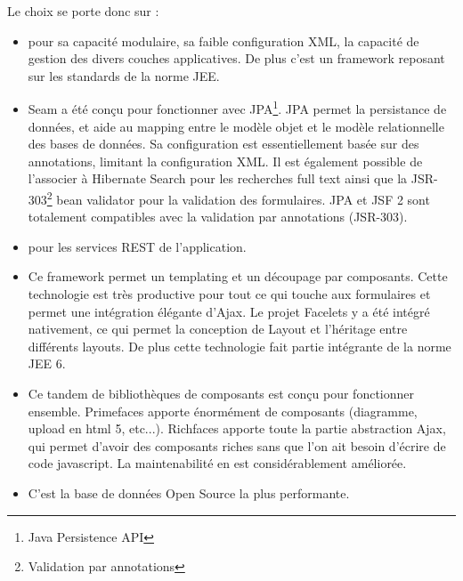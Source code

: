 \newpage{}
Le choix se porte donc sur :
\begin{itemize}
	\item {}
		pour sa capacité modulaire, sa faible configuration XML, la capacité de gestion des divers 
		couches applicatives. De plus c'est un framework reposant sur les standards de la norme JEE.
		\\
		
	\item {}	
		Seam a été conçu pour fonctionner avec JPA\footnote{Java Persistence API}. JPA permet la persistance de données, et aide
		au mapping entre le modèle objet et le modèle relationnelle des bases de données. Sa configuration
		est essentiellement basée sur des annotations, limitant la configuration XML. Il est également
		possible de l'associer à Hibernate Search pour les recherches full text ainsi que la
		JSR-303\footnote{Validation par annotations} bean
		validator pour la validation des formulaires. JPA et JSF 2 sont totalement compatibles avec 
		la validation par annotations (JSR-303).
		\\
		
	\item {} pour les services REST de l'application.
		\\
		
	\item {}
		Ce framework  permet un templating et un découpage par composants. Cette technologie est très 
		productive pour tout ce qui touche aux formulaires et permet une intégration élégante
		d'Ajax. Le projet Facelets y a été intégré nativement, ce qui permet la conception 
		de Layout et l'héritage entre différents layouts. De plus cette technologie fait
		partie intégrante de la norme JEE 6.
		\\
			    			
	\item {}
		Ce tandem de bibliothèques de composants est conçu pour fonctionner ensemble. Primefaces
		apporte énormément de composants (diagramme, upload en html 5, etc...). Richfaces apporte
		toute la partie abstraction Ajax, qui permet d'avoir des composants riches sans que l'on ait 
		besoin d'écrire de code javascript. La maintenabilité en est considérablement améliorée. 
		\\
				
	\item {}	 C'est la base de données Open Source la plus performante.
		\\
			

\end{itemize}
